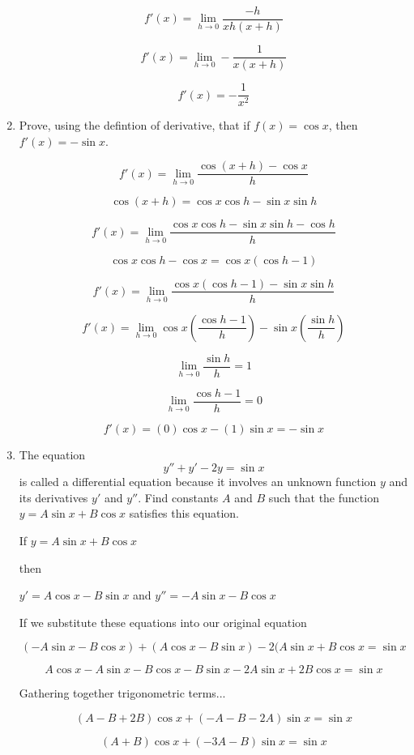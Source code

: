 \documentclass{article}
\begin{document}
\begin{enumerate}
				$$f'(x) = \lim \limits _{h \to 0} \frac{-h}{xh(x+h)}$$

				$$f'(x) = \lim \limits _{h \to 0} - \frac{1}{x(x+h)}$$

				$$f'(x) = - \frac{1}{x^2}$$

			\item Prove, using the defintion of derivative, that if $f(x) = \cos x$, then $f'(x) = -\sin x$.

				$$f'(x) = \lim \limits _{h \to 0} \frac{\cos (x+h) - \cos x}{h}$$

				$$\cos (x+h) = \cos x \cos h - \sin x \sin h$$

				$$f'(x) = \lim \limits _{h \to 0} \frac{\cos x \cos h - \sin x \sin h - \cos h}{h}$$

				$$\cos x \cos h - \cos x = \cos x (\cos h - 1)$$

				$$f'(x) = \lim \limits _{h \to 0} \frac{\cos x ( \cos h - 1) - \sin x \sin h}{h}$$

				$$f'(x) = \lim \limits _{h \to 0} \cos x (\frac{\cos h - 1}{h}) - \sin x (\frac{\sin h}{h})$$

				$$\lim \limits _{h \to 0} \frac{\sin h}{h} = 1$$

				$$\lim \limits _{h \to 0} \frac{\cos h - 1}{h} = 0$$

				$$f'(x) = (0)\cos x - (1) \sin x = - \sin x$$
			\item The equation $$y'' + y' - 2y = \sin x$$ is called a differential equation because
				it involves an unknown function $y$ and its derivatives $y'$ and $y''$. Find constants
				$A$ and $B$ such that the function $y = A \sin x + B \cos x$ satisfies this
				equation.

				If $y = A \sin x + B \cos x$

				then

				$y' = A \cos x - B \sin x$ and $y'' = - A\sin x - B \cos x$

				If we substitute these equations into our original equation

				$$(-A \sin x - B \cos x) + (A \cos x - B \sin x) - 2(A \sin x + B \cos x = \sin x$$

				$$A \cos x - A \sin x - B \cos x - B \sin x - 2A \sin x + 2B \cos x = \sin x$$

				Gathering together trigonometric terms...

				$$(A - B + 2B) \cos x +(-A - B - 2A) \sin x = \sin x$$

				$$(A+B) \cos x + (-3A - B) \sin x = \sin x$$


\end{enumerate}
\end{document}
